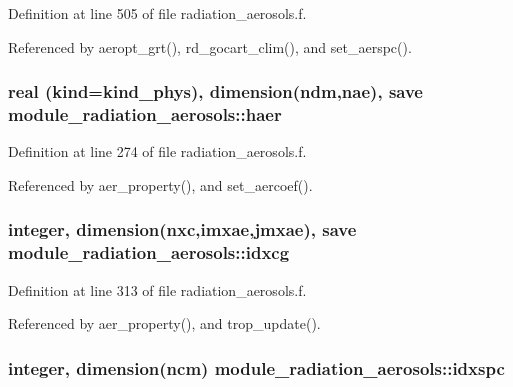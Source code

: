 Definition at line 505 of file radiation\+\_\+aerosols.\+f.



Referenced by aeropt\+\_\+grt(), rd\+\_\+gocart\+\_\+clim(), and set\+\_\+aerspc().

\subsubsection[{\texorpdfstring{haer}{haer}}]{\setlength{\rightskip}{0pt plus 5cm}real (kind=kind\+\_\+phys), dimension({\bf ndm},{\bf nae}), save module\+\_\+radiation\+\_\+aerosols\+::haer\hspace{0.3cm}{\ttfamily [private]}}\hypertarget{namespacemodule__radiation__aerosols_a8ce24a58afb33dd372995bf5aaf95be9}{}\label{namespacemodule__radiation__aerosols_a8ce24a58afb33dd372995bf5aaf95be9}


Definition at line 274 of file radiation\+\_\+aerosols.\+f.



Referenced by aer\+\_\+property(), and set\+\_\+aercoef().

\subsubsection[{\texorpdfstring{idxcg}{idxcg}}]{\setlength{\rightskip}{0pt plus 5cm}integer, dimension({\bf nxc},{\bf imxae},{\bf jmxae}), save module\+\_\+radiation\+\_\+aerosols\+::idxcg\hspace{0.3cm}{\ttfamily [private]}}\hypertarget{namespacemodule__radiation__aerosols_a4cb38abaf6ece5a0ed717edd6f6b4078}{}\label{namespacemodule__radiation__aerosols_a4cb38abaf6ece5a0ed717edd6f6b4078}


Definition at line 313 of file radiation\+\_\+aerosols.\+f.



Referenced by aer\+\_\+property(), and trop\+\_\+update().

\subsubsection[{\texorpdfstring{idxspc}{idxspc}}]{\setlength{\rightskip}{0pt plus 5cm}integer, dimension({\bf ncm}) module\+\_\+radiation\+\_\+aerosols\+::idxspc\hspace{0.3cm}{\ttfamily [private]}}\hypertarget{namespacemodule__radiation__aerosols_a8ca79ca1e5161374aff3cad4121b360f}{}\label{namespacemodule__radiation__aerosols_a8ca79ca1e5161374aff3cad4121b360f}


